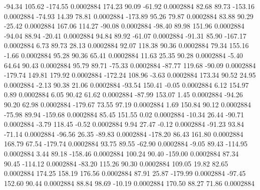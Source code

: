       -94.34      105.62     -174.55     0.0002884
      174.23       90.09      -61.92     0.0002884
       82.68       89.73     -153.16     0.0002884
      -74.93       14.39       78.81     0.0002884
     -173.89       95.26       79.87     0.0002884
       83.88       90.29      -25.42     0.0002884
      167.06      114.27      -90.08     0.0002884
      -98.40       89.98      151.96     0.0002884
      -94.04       88.94      -20.41     0.0002884
       94.84       89.92      -61.07     0.0002884
      -91.31       85.90     -167.17     0.0002884
        6.73       89.73       28.13     0.0002884
       92.07      118.38       90.36     0.0002884
       79.34      155.16       -1.66     0.0002884
       95.28       90.36       65.41     0.0002884
       11.63       25.35       90.28     0.0002884
       -5.40       64.64       90.43     0.0002884
       95.79       89.71      -75.33     0.0002884
      -87.77      119.68      -90.09     0.0002884
     -179.74      149.81      179.92     0.0002884
     -172.24      108.96       -3.63     0.0002884
      173.34       90.52       24.95     0.0002884
       -2.13       90.38       21.06     0.0002884
      -93.54      150.41       -0.05     0.0002884
        6.12      154.97        0.89     0.0002884
        6.05       90.42       61.62     0.0002884
      -87.99      153.07        1.45     0.0002884
      -94.26       90.20       62.98     0.0002884
     -179.67       73.55       97.19     0.0002884
        1.69      150.84       90.12     0.0002884
      -75.98       89.94     -159.68     0.0002884
       85.45      151.55        0.02     0.0002884
      -10.34       26.44      -90.71     0.0002884
       -3.79      118.45       -0.52     0.0002884
        9.94       27.47       -0.12     0.0002884
      -91.23       93.84      -71.14     0.0002884
      -96.56       26.35      -89.83     0.0002884
     -178.20       86.43      161.80     0.0002884
      168.79       67.54     -179.74     0.0002884
       93.75       89.55      -62.90     0.0002884
       -9.05       89.43     -114.95     0.0002884
        3.44       89.18     -158.46     0.0002884
      100.24       90.40     -159.00     0.0002884
       87.34       90.45     -114.12     0.0002884
      -83.20      115.26       90.30     0.0002884
      109.05       19.82       82.65     0.0002884
      174.25      158.19      176.56     0.0002884
       87.91       25.87     -179.99     0.0002884
      -97.45      152.60       90.44     0.0002884
       88.84       98.69      -10.19     0.0002884
      170.50       88.27       71.86     0.0002884
